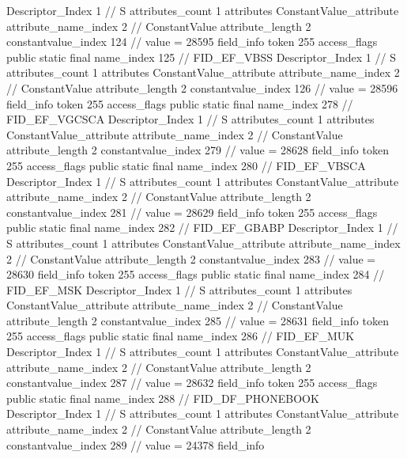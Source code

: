 {{{{{				Descriptor_Index	1		// S
				attributes_count	1
				attributes {
				ConstantValue_attribute {
					attribute_name_index	2		// ConstantValue
					attribute_length	2
					constantvalue_index	124		// value = 28595
				}
				}
			}
			field_info {
				token	255
				access_flags	public static final
				name_index	125		// FID_EF_VBSS
				Descriptor_Index	1		// S
				attributes_count	1
				attributes {
				ConstantValue_attribute {
					attribute_name_index	2		// ConstantValue
					attribute_length	2
					constantvalue_index	126		// value = 28596
				}
				}
			}
			field_info {
				token	255
				access_flags	public static final
				name_index	278		// FID_EF_VGCSCA
				Descriptor_Index	1		// S
				attributes_count	1
				attributes {
				ConstantValue_attribute {
					attribute_name_index	2		// ConstantValue
					attribute_length	2
					constantvalue_index	279		// value = 28628
				}
				}
			}
			field_info {
				token	255
				access_flags	public static final
				name_index	280		// FID_EF_VBSCA
				Descriptor_Index	1		// S
				attributes_count	1
				attributes {
				ConstantValue_attribute {
					attribute_name_index	2		// ConstantValue
					attribute_length	2
					constantvalue_index	281		// value = 28629
				}
				}
			}
			field_info {
				token	255
				access_flags	public static final
				name_index	282		// FID_EF_GBABP
				Descriptor_Index	1		// S
				attributes_count	1
				attributes {
				ConstantValue_attribute {
					attribute_name_index	2		// ConstantValue
					attribute_length	2
					constantvalue_index	283		// value = 28630
				}
				}
			}
			field_info {
				token	255
				access_flags	public static final
				name_index	284		// FID_EF_MSK
				Descriptor_Index	1		// S
				attributes_count	1
				attributes {
				ConstantValue_attribute {
					attribute_name_index	2		// ConstantValue
					attribute_length	2
					constantvalue_index	285		// value = 28631
				}
				}
			}
			field_info {
				token	255
				access_flags	public static final
				name_index	286		// FID_EF_MUK
				Descriptor_Index	1		// S
				attributes_count	1
				attributes {
				ConstantValue_attribute {
					attribute_name_index	2		// ConstantValue
					attribute_length	2
					constantvalue_index	287		// value = 28632
				}
				}
			}
			field_info {
				token	255
				access_flags	public static final
				name_index	288		// FID_DF_PHONEBOOK
				Descriptor_Index	1		// S
				attributes_count	1
				attributes {
				ConstantValue_attribute {
					attribute_name_index	2		// ConstantValue
					attribute_length	2
					constantvalue_index	289		// value = 24378
				}
				}
			}
			field_info {
}}}}}
